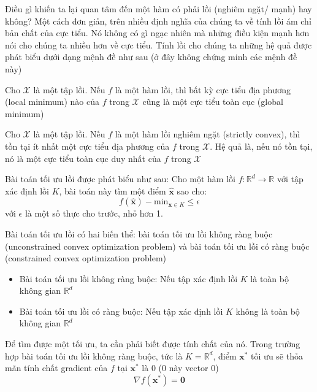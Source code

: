 Điều gì khiến ta lại quan tâm đến một hàm có phải lồi (nghiêm ngặt/ mạnh) hay không? Một cách đơn giản, trên nhiều định nghĩa của chúng ta về tính lồi ám chỉ bản chất của cực tiểu. Nó không có gì ngạc nhiên mà những điều kiện mạnh hơn nói cho chúng ta nhiều hơn về cực tiểu. Tính lồi cho chúng ta những hệ quả được phát biểu dưới dạng mệnh đề như sau (ở đây không chứng minh các mệnh đề này)

\begin{prop}
    Cho $\mathcal{X}$ là một tập lồi. Nếu $f$ là một hàm lồi, thì bất kỳ cực tiểu địa phương (local minimum) nào của $f$ trong $\mathcal{X}$ cũng là một cực tiểu toàn cục (global minimum)
\end{prop}

\begin{prop}
    Cho $\mathcal{X}$ là một tập lồi. Nếu $f$ là một hàm lồi nghiêm ngặt (strictly convex), thì tồn tại ít nhất một cực tiểu địa phương của $f$ trong $\mathcal{X}$. Hệ quả là, nếu nó tồn tại, nó là một cực tiểu toàn cục duy nhất của $f$ trong $\mathcal{X}$
\end{prop}

Bài toán tối ưu lồi được phát biểu như sau: Cho một hàm lồi $f: \mathbb{R}^d \rightarrow \mathbb{R}$ với tập xác định lồi $K$, bài toán này tìm một điểm $\hat{\mathbf{x}}$ sao cho:
\begin{equation}
    f(\hat{\mathbf{x}}) - \text{min}_{\mathbf{x} \in K} \leq \epsilon
\end{equation}
với $\epsilon$ là một số thực cho trước, nhỏ hơn 1.

Bài toán tối ưu lồi có hai biến thể: bài toán tối ưu lồi không ràng buộc (unconstrained convex optimization problem) và bài toán tối ưu lồi có ràng buộc (constrained convex optimization problem)
\begin{itemize}
    \item Bài toán tối ưu lồi không ràng buộc: Nếu tập xác định lồi $K$ là toàn bộ không gian $\mathbb{R}^d$
    \item Bài toán tối ưu lồi có ràng buộc: Nếu tập xác định lồi $K$ không là toàn bộ không gian $\mathbb{R}^d$
\end{itemize}

Để tìm được một tối ưu, ta cần phải biết được tính chất của nó. Trong trường hợp bài toán tối ưu lồi không ràng buộc, tức là $K = \mathbb{R}^d$, điểm $\mathbf{x}^{*}$ tối ưu sẽ thỏa mãn tính chất gradient của $f$ tại $\mathbf{x}^{*}$ là 0 (0 này vector 0)
\begin{equation}
    \nabla f(\mathbf{x}^{*}) = \mathbf{0}
\end{equation}

